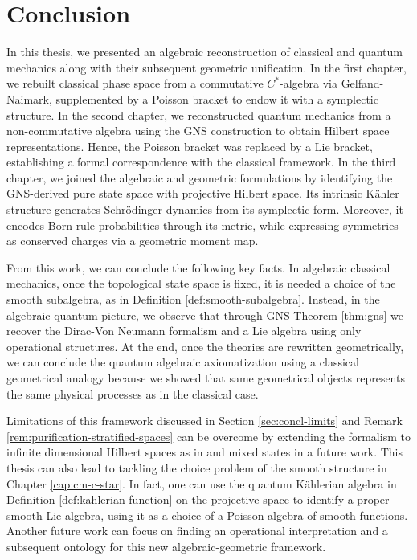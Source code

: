 \chapter*{Conclusion}
\label{cap:conclusione}
In this thesis, we presented an algebraic reconstruction of classical and quantum mechanics along with their subsequent geometric unification. In the first chapter, we rebuilt classical phase space from a commutative $C^*$-algebra via Gelfand-Naimark, supplemented by a Poisson bracket to endow it with a symplectic structure. In the second chapter, we reconstructed quantum mechanics from a non-commutative algebra using the GNS construction to obtain Hilbert space representations. Hence, the Poisson bracket was replaced by a Lie bracket, establishing a formal correspondence with the classical framework. In the third chapter, we joined the algebraic and geometric formulations by identifying the GNS-derived pure state space with projective Hilbert space. Its intrinsic Kähler structure generates Schrödinger dynamics from its symplectic form. Moreover, it encodes Born-rule probabilities through its metric, while expressing symmetries as conserved charges via a geometric moment map.

From this work, we can conclude the following key facts. In algebraic classical mechanics, once the topological state space is fixed, it is needed a choice of the smooth subalgebra, as in Definition \ref{def:smooth-subalgebra}. Instead, in the algebraic quantum picture, we observe that through GNS Theorem \ref{thm:gns} we recover the Dirac-Von Neumann formalism and a Lie algebra using only operational structures. At the end, once the theories are rewritten geometrically, we can conclude the quantum algebraic axiomatization using a classical geometrical analogy because we showed that same geometrical objects represents the same physical processes as in the classical case.

Limitations of this framework discussed in Section \ref{sec:concl-limits} and Remark \ref{rem:purification-stratified-spaces} can be overcome by extending the formalism to infinite dimensional Hilbert spaces as in \cite{bratteliOperatorAlgebrasQuantum} and mixed states in a future work. This thesis can also lead to tackling the choice problem of the smooth structure in Chapter \ref{cap:cm-c-star}. In fact, one can use the quantum Kählerian algebra in Definition \ref{def:kahlerian-function} on the projective space to identify a proper smooth Lie algebra, using it as a choice of a Poisson algebra of smooth functions. Another future work can focus on finding an operational interpretation and a subsequent ontology for this new algebraic-geometric framework. 

